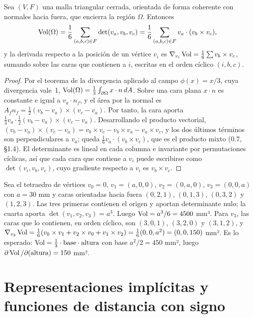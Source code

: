 \begin{proposicion}\label{prop:volumen}
Sea $(V,F)$ una malla triangular cerrada, orientada de forma coherente con normales hacia fuera, que encierra la región $\Omega$. Entonces
\[
\operatorname{Vol}(\Omega)=\frac16\sum_{(a,b,c)\in F}\det(v_a,v_b,v_c)=\frac16\sum_{(a,b,c)\in F}v_a\cdot(v_b\times v_c),
\]
y la derivada respecto a la posición de un vértice $v_i$ es $\nabla_{v_i}\operatorname{Vol}=\frac16\sum v_b\times v_c$, sumando sobre las caras que contienen a $i$, escritas en el orden cíclico $(i,b,c)$.
\end{proposicion}

\begin{proof}
Por el teorema de la divergencia aplicado al campo $\phi(x)=x/3$, cuya divergencia vale~1, $\operatorname{Vol}(\Omega)=\frac13\int_{\partial\Omega}x\cdot n\,dA$. Sobre una cara plana $x\cdot n$ es constante e igual a $v_a\cdot n_f$, y el área por la normal es $A_fn_f=\frac12(v_b-v_a)\times(v_c-v_a)$. Por tanto, la cara aporta $\frac13 v_a\cdot\frac12(v_b-v_a)\times(v_c-v_a)$. Desarrollando el producto vectorial, $(v_b-v_a)\times(v_c-v_a)=v_b\times v_c-v_b\times v_a-v_a\times v_c$, y los dos últimos términos son perpendiculares a $v_a$; queda $\frac16 v_a\cdot(v_b\times v_c)$, que es el producto mixto (0.7, §1.4). El determinante es lineal en cada columna e invariante por permutaciones cíclicas, así que cada cara que contiene a $v_i$ puede escribirse como $\det(v_i,v_b,v_c)$, cuyo gradiente respecto a $v_i$ es $v_b\times v_c$.
\end{proof}

\begin{ejemplo}\label{ej:tetra}
Sea el tetraedro de vértices $v_0=0$, $v_1=(a,0,0)$, $v_2=(0,a,0)$, $v_3=(0,0,a)$ con $a=30$ mm y caras orientadas hacia fuera $(0,2,1)$, $(0,1,3)$, $(0,3,2)$ y $(1,2,3)$. Las tres primeras contienen el origen y aportan determinante nulo; la cuarta aporta $\det(v_1,v_2,v_3)=a^3$. Luego $\operatorname{Vol}=a^3/6=4500$ mm³. Para $v_3$, las caras que lo contienen, en orden cíclico, son $(3,0,1)$, $(3,2,0)$ y $(3,1,2)$, y $\nabla_{v_3}\operatorname{Vol}=\frac16(v_0\times v_1+v_2\times v_0+v_1\times v_2)=\frac16(0,0,a^2)=(0,0,150)$ mm². Es lo esperado: $\operatorname{Vol}=\frac13\cdot\text{base}\cdot\text{altura}$ con base $a^2/2=450$ mm², luego $\partial\operatorname{Vol}/\partial(\text{altura})=150$ mm².
\end{ejemplo}

\section{Representaciones implícitas y funciones de distancia con signo}

